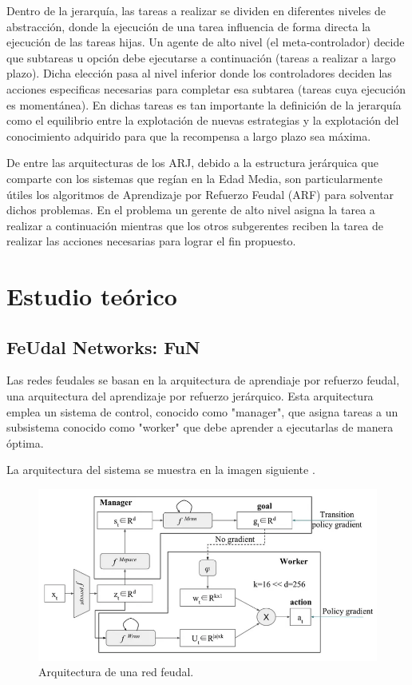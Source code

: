 \documentclass[letterpaper]{article} %
\begin{document}
Dentro de la jerarquía, las tareas a realizar se dividen en diferentes niveles de abstracción, donde la ejecución de una tarea influencia de forma directa la ejecución de las tareas hijas. Un agente de alto nivel (el meta-controlador) decide que subtareas u opción debe ejecutarse a continuación (tareas a realizar a largo plazo). Dicha elección pasa al nivel inferior donde los controladores deciden las acciones especificas necesarias para completar esa subtarea (tareas cuya ejecución es momentánea). En dichas tareas es tan importante la definición de la jerarquía como el equilibrio entre la explotación de nuevas estrategias y la explotación del conocimiento adquirido para que la recompensa a largo plazo sea máxima.

De entre las arquitecturas de los ARJ, debido a la estructura jerárquica que comparte con los sistemas que regían en la Edad Media, son particularmente útiles los algoritmos de Aprendizaje por Refuerzo Feudal (ARF) para solventar dichos problemas. En el problema un gerente de alto nivel asigna la tarea a realizar a continuación mientras que los otros subgerentes reciben la tarea de realizar las acciones necesarias para lograr el fin propuesto.
\cite {geeksforgeeks2024hrl,sutton1999between,barto2003recent,dietterich2000hierarchical}
\section{Estudio teórico}

\subsection{FeUdal Networks: FuN}

Las redes feudales se basan en la arquitectura de aprendiaje por refuerzo feudal, 
una arquitectura del aprendizaje por refuerzo jerárquico. Esta arquitectura emplea un sistema de control, conocido
como "manager", que asigna tareas a un subsistema conocido como "worker" que debe aprender a ejecutarlas de manera óptima.

La arquitectura del sistema se muestra en la imagen siguiente \cite{feudal_networks_2024}.

\begin{figure}[H]
    \centering
    \includegraphics[width=0.9\columnwidth]{feudal_arquitecture.png}
    \caption{Arquitectura de una red feudal.}
    \label{fig:arquitectura_feudal}
\end{figure}
\end{document}
